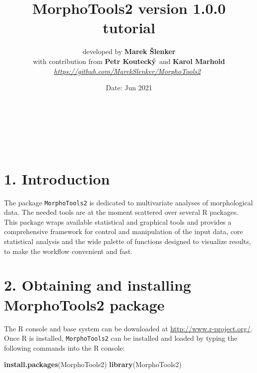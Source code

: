 \documentclass[
]{article}
\title{\vspace{+2.0cm} MorphoTools2 version 1.0.0 tutorial \vspace{+2.0cm}}
\author{developed by \textbf{Marek
Šlenker}\footnotemark[2] \footnotemark[3] \footnotemark[1] \vspace*{0.5pc}\\
with contribution from \textbf{Petr Koutecký}\footnotemark[4] ~and
\textbf{Karol
Marhold}\footnotemark[2] \footnotemark[3] \vspace*{0.7pc}\\
\emph{\url{https://github.com/MarekSlenker/MorphoTools2}}~\\
\vspace*{0.7pc}}
\date{Date: Jun 2021}
\newenvironment{Shaded}{\begin{snugshade}}{\end{snugshade}}
\newcommand{\KeywordTok}[1]{\textcolor[rgb]{0.13,0.29,0.53}{\textbf{#1}}}
\newcommand{\NormalTok}[1]{#1}
\begin{document}
\maketitle

~\\
\renewcommand{\thefootnote}{\fnsymbol{footnote}}\\
\\

\newpage

\renewcommand{\baselinestretch}{0.4}
\setcounter{tocdepth}{4}
\tableofcontents
\renewcommand{\baselinestretch}{1.0}\normalsize

\hypertarget{introduction}{%
\section{1. Introduction}\label{introduction}}

The package \texttt{MorphoTools2} is dedicated to multivariate analyses
of morphological data. The needed tools are at the moment scattered over
several R packages. This package wraps available statistical and
graphical tools and provides a comprehensive framework for control and
manipulation of the input data, core statistical analysis and the wide
palette of functions designed to visualize results, to make the workflow
convenient and fast.

\renewcommand{\thefootnote}{\arabic{footnote}}

\hypertarget{obtaining-and-installing-morphotools2-package}{%
\section{2. Obtaining and installing MorphoTools2
package}\label{obtaining-and-installing-morphotools2-package}}

The R console and base system can be downloaded at
\url{http://www.r-project.org/}. Once R is installed,
\texttt{MorphoTools2} can be installed and loaded by typing the
following commands into the R console:

\begin{Shaded}
\begin{Highlighting}[]
\KeywordTok{install.packages}\NormalTok{(MorphoTools2)}
\KeywordTok{library}\NormalTok{(MorphoTools2)}
\end{Highlighting}
\end{Shaded}
\end{document}
